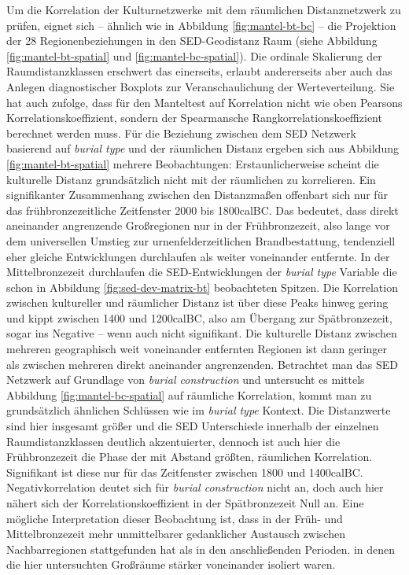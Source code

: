 \documentclass[openany,twoside,twocolumn]{book}
\begin{document}
Um die Korrelation der Kulturnetzwerke mit dem räumlichen
Distanznetzwerk zu prüfen, eignet sich -- ähnlich wie in Abbildung
\ref{fig:mantel-bt-bc} -- die Projektion der 28 Regionenbeziehungen in
den SED-Geodistanz Raum (siehe Abbildung \ref{fig:mantel-bt-spatial} und
\ref{fig:mantel-bc-spatial}). Die ordinale Skalierung der
Raumdistanzklassen erschwert das einerseits, erlaubt andererseits aber
auch das Anlegen diagnostischer Boxplots zur Veranschaulichung der
Werteverteilung. Sie hat auch zufolge, dass für den Manteltest auf
Korrelation nicht wie oben Pearsons Korrelationskoeffizient, sondern der
Spearmansche Rangkorrelationskoeffizient berechnet werden muss. Für die
Beziehung zwischen dem SED Netzwerk basierend auf \emph{burial type} und
der räumlichen Distanz ergeben sich aus Abbildung
\ref{fig:mantel-bt-spatial} mehrere Beobachtungen: Erstaunlicherweise
scheint die kulturelle Distanz grundsätzlich nicht mit der räumlichen zu
korrelieren. Ein signifikanter Zusammenhang zwischen den Distanzmaßen
offenbart sich nur für das frühbronzezeitliche Zeitfenster 2000 bis
1800calBC. Das bedeutet, dass direkt aneinander angrenzende Großregionen
nur in der Frühbronzezeit, also lange vor dem universellen Umstieg zur
urnenfelderzeitlichen Brandbestattung, tendenziell eher gleiche
Entwicklungen durchlaufen als weiter voneinander entfernte. In der
Mittelbronzezeit durchlaufen die SED-Entwicklungen der \emph{burial
type} Variable die schon in Abbildung \ref{fig:sed-dev-matrix-bt}
beobachteten Spitzen. Die Korrelation zwischen kultureller und
räumlicher Distanz ist über diese Peaks hinweg gering und kippt zwischen
1400 und 1200calBC, also am Übergang zur Spätbronzezeit, sogar ins
Negative -- wenn auch nicht signifikant. Die kulturelle Distanz zwischen
mehreren geographisch weit voneinander entfernten Regionen ist dann
geringer als zwischen mehreren direkt aneinander angrenzenden.
Betrachtet man das SED Netzwerk auf Grundlage von \emph{burial
construction} und untersucht es mittels Abbildung
\ref{fig:mantel-bc-spatial} auf räumliche Korrelation, kommt man zu
grundsätzlich ähnlichen Schlüssen wie im \emph{burial type} Kontext. Die
Distanzwerte sind hier insgesamt größer und die SED Unterschiede
innerhalb der einzelnen Raumdistanzklassen deutlich akzentuierter,
dennoch ist auch hier die Frühbronzezeit die Phase der mit Abstand
größten, räumlichen Korrelation. Signifikant ist diese nur für das
Zeitfenster zwischen 1800 und 1400calBC. Negativkorrelation deutet sich
für \emph{burial construction} nicht an, doch auch hier nähert sich der
Korrelationskoeffizient in der Spätbronzezeit Null an. Eine mögliche
Interpretation dieser Beobachtung ist, dass in der Früh- und
Mittelbronzezeit mehr unmittelbarer gedanklicher Austausch zwischen
Nachbarregionen stattgefunden hat als in den anschließenden Perioden. in
denen die hier untersuchten Großräume stärker voneinander isoliert
waren.
\end{document}
